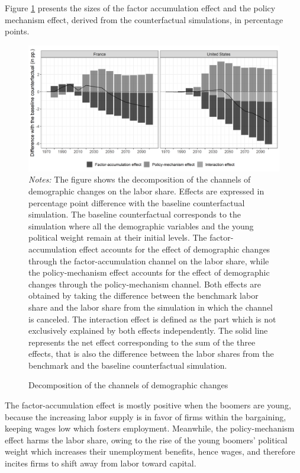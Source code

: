 Figure \ref{chap1-fig:quant-decomp-channel} presents the sizes of the factor accumulation effect and the policy mechanism effect, derived from the counterfactual simulations, in percentage points.
\begin{figure}[!tb]
	\centering
	\caption{Decomposition of the channels of demographic changes} \label{chap1-fig:quant-decomp-channel}
	\includegraphics[width=1\linewidth]{chap1/graphic/quant-decomp-channel.png}
	\vspace{-3em}
	\justify\singlespacing\footnotesize\textit{Notes:} The figure shows the decomposition of the channels of demographic changes on the labor share. Effects are expressed in percentage point difference with the baseline counterfactual simulation. The baseline counterfactual corresponds to the simulation where all the demographic variables and the young political weight remain at their initial levels. The factor-accumulation effect accounts for the effect of demographic changes through the factor-accumulation channel on the labor share, while the policy-mechanism effect accounts for the effect of demographic changes through the policy-mechanism channel. Both effects are obtained by taking the difference between the benchmark labor share and the labor share from the simulation in which the channel is canceled. The interaction effect is defined as the part which is not exclusively explained by both effects independently. The solid line represents the net effect corresponding to the sum of the three effects, that is also the difference between the labor shares from the benchmark and the baseline counterfactual simulation.
\end{figure}
The factor-accumulation effect is mostly positive when the boomers are young, because the increasing labor supply is in favor of firms within the bargaining, keeping wages low which fosters employment. 
Meanwhile, the policy-mechanism effect harms the labor share, owing to the rise of the young boomers' political weight which increases their unemployment benefits, hence wages, and therefore incites firms to shift away from labor toward capital.

